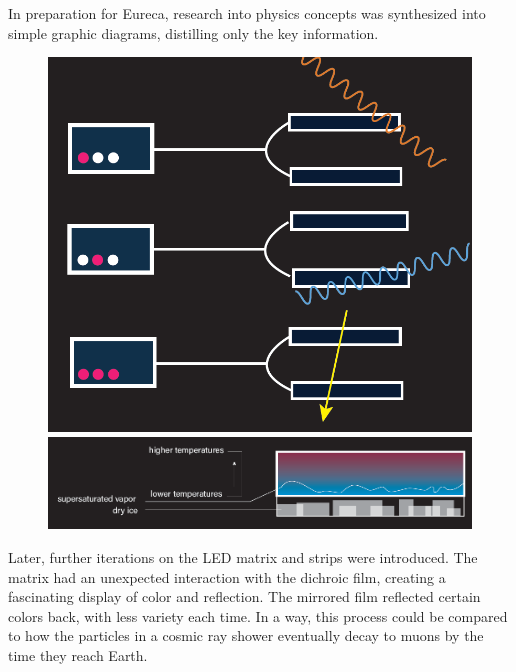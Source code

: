 \documentclass{article}
\begin{document}
In preparation for Eureca, research into physics concepts was synthesized into simple graphic diagrams, distilling only the key information.

\begin{figure} [h]
    \centering
  \begin{minipage}[b]{0.4\textwidth}
    \includegraphics[width=\textwidth]{images/unnamed10.png}
  \end{minipage}
  \hfill
  \begin{minipage}[b]{1\textwidth}
    \includegraphics[width=\textwidth]{images/unnamed11.png}
  \end{minipage}
\end{figure}

\newpage

Later, further iterations on the LED matrix and strips were introduced. The matrix had an unexpected interaction with the dichroic film, creating a fascinating display of color and reflection. The mirrored film reflected certain colors back, with less variety each time. In a way, this process could be compared to how the particles in a cosmic ray shower eventually decay to muons by the time they reach Earth. 
\end{document}
